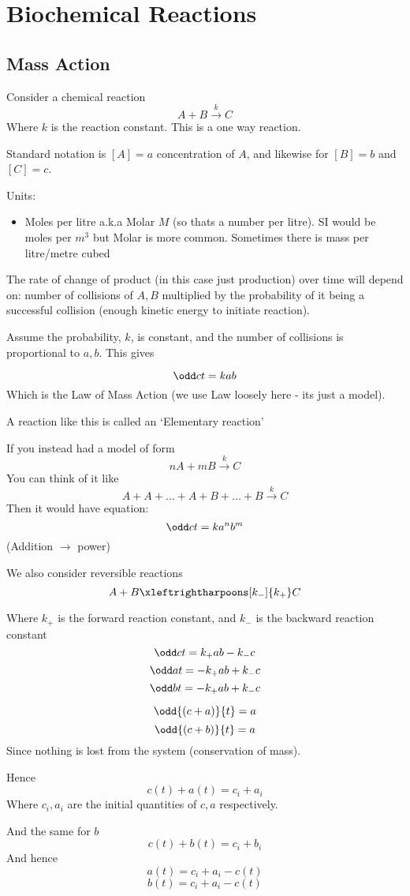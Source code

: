 \documentclass{X:/Documents/Coding/Latex/myassignment}
\begin{document}
\section{Biochemical Reactions}
\subsection{Mass Action}
Consider a chemical reaction
\[A + B \xrightarrow{k} C\]
Where $k$ is the reaction constant. This is a one way reaction. 

Standard notation is $[A] = a$ concentration of $A$, and likewise for $[B] =b$ and $[C] = c$.

Units:
\begin{itemize}
	\item Moles per litre a.k.a Molar $M$ (so thats a number per litre). SI would be moles per $m^3$ but Molar is more common. Sometimes there is mass per litre/metre cubed
\end{itemize}

The rate of change of product (in this case just production) over time will depend on: number of collisions of $A,B$ multiplied by the probability of it being a successful collision (enough kinetic energy to initiate reaction).

Assume the probability, $k$, is constant, and the number of collisions is proportional to $a,b$. This gives

\[\odd ct = kab\]
Which is the Law of Mass Action (we use Law loosely here - its just a model).

A reaction like this is called an `Elementary reaction'

If you instead had a model of form
\[nA + mB \xrightarrow{k} C\]
You can think of it like
\[A + A+ \ldots + A + B + \ldots + B \xrightarrow{k} C\]
Then it would have equation:
\[\odd ct = k a^n b^m\]
(Addition $\to$ power)


We also consider reversible reactions
\[A + B \xleftrightharpoons[k_-]{k_+} C \]

Where $k_+$ is the forward reaction constant, and $k_-$ is the backward reaction constant
\[\odd ct = k_+ ab - k_- c\]
\[\odd at = -k_+ ab + k_- c\]
\[\odd bt = -k_+ ab + k_- c\]

\[\odd{(c+a)}{t} = a\]
\[\odd{(c+b)}{t} = a\]
Since nothing is lost from the system (conservation of mass).

Hence
\[c(t) + a(t) = c_i + a_i\]
Where $c_i,a_i$ are the initial quantities of $c,a$ respectively.

And the same for $b$
\[c(t) + b(t) = c_i + b_i\]
And hence
\[a(t) = c_i + a_i - c(t)\]
\[b(t) = c_i + a_i - c(t)\]
\end{document}
